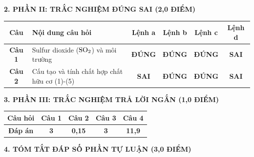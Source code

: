 \documentclass[11pt,a4paper]{article}
\begin{document}
\vspace{4pt}
{\bfseries\color{mainGreen} 2. PHẦN II: TRẮC NGHIỆM ĐÚNG SAI (2,0 ĐIỂM)}

\vspace{2pt}
\begin{center}
\renewcommand{\arraystretch}{1.2}
\begin{tabular}{|c|p{7.5cm}|c|c|c|c|}
\hline
\rowcolor{tableGreen}
\textbf{Câu} & \textbf{Nội dung câu hỏi} & \textbf{Lệnh a} & \textbf{Lệnh b} & \textbf{Lệnh c} & \textbf{Lệnh d} \\ \hline
\textbf{Câu 1} & Sulfur dioxide ($\ce{SO2}$) và môi trường & \textbf{\color{hfRed}ĐÚNG} & \textbf{\color{hfRed}ĐÚNG} & \textbf{\color{hfRed}ĐÚNG} & \textbf{SAI} \\ \hline
\textbf{Câu 2} & Cấu tạo và tính chất hợp chất hữu cơ (1)-(5) & \textbf{SAI} & \textbf{\color{hfRed}ĐÚNG} & \textbf{\color{hfRed}ĐÚNG} & \textbf{SAI} \\ \hline
\end{tabular}
\end{center}

\vspace{4pt}
{\bfseries\color{mainGreen} 3. PHẦN III: TRẮC NGHIỆM TRẢ LỜI NGẮN (1,0 ĐIỂM)}

\vspace{2pt}
\begin{center}
\renewcommand{\arraystretch}{1.2}
\begin{tabular}{|c|c|c|c|c|}
\hline
\rowcolor{tableGreen}
\textbf{Câu hỏi} & \textbf{Câu 1} & \textbf{Câu 2} & \textbf{Câu 3} & \textbf{Câu 4} \\ \hline
\textbf{Đáp án} & \textbf{\color{hfRed}3} & \textbf{\color{hfRed}0,15} & \textbf{\color{hfRed}3} & \textbf{\color{hfRed}11,9} \\ \hline
\end{tabular}
\end{center}

\vspace{4pt}
{\bfseries\color{mainGreen} 4. TÓM TẮT ĐÁP SỐ PHẦN TỰ LUẬN (3,0 ĐIỂM)}
\end{document}
